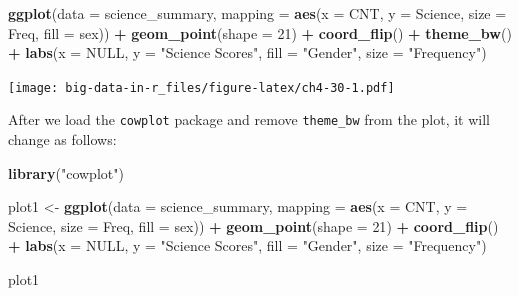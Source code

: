 \documentclass[]{book}
\newenvironment{Shaded}{\begin{snugshade}}{\end{snugshade}}
\newcommand{\DataTypeTok}[1]{\textcolor[rgb]{0.13,0.29,0.53}{#1}}
\newcommand{\DecValTok}[1]{\textcolor[rgb]{0.00,0.00,0.81}{#1}}
\newcommand{\KeywordTok}[1]{\textcolor[rgb]{0.13,0.29,0.53}{\textbf{#1}}}
\newcommand{\NormalTok}[1]{#1}
\newcommand{\OperatorTok}[1]{\textcolor[rgb]{0.81,0.36,0.00}{\textbf{#1}}}
\newcommand{\OtherTok}[1]{\textcolor[rgb]{0.56,0.35,0.01}{#1}}
\newcommand{\StringTok}[1]{\textcolor[rgb]{0.31,0.60,0.02}{#1}}
\begin{document}
\begin{Shaded}
\begin{Highlighting}[]
\KeywordTok{ggplot}\NormalTok{(}\DataTypeTok{data =}\NormalTok{ science_summary,}
       \DataTypeTok{mapping =} \KeywordTok{aes}\NormalTok{(}\DataTypeTok{x =}\NormalTok{ CNT, }\DataTypeTok{y =}\NormalTok{ Science, }\DataTypeTok{size =}\NormalTok{ Freq, }\DataTypeTok{fill =}\NormalTok{ sex)) }\OperatorTok{+}
\StringTok{  }\KeywordTok{geom_point}\NormalTok{(}\DataTypeTok{shape =} \DecValTok{21}\NormalTok{) }\OperatorTok{+}
\StringTok{  }\KeywordTok{coord_flip}\NormalTok{() }\OperatorTok{+}
\StringTok{  }\KeywordTok{theme_bw}\NormalTok{() }\OperatorTok{+}\StringTok{ }
\StringTok{  }\KeywordTok{labs}\NormalTok{(}\DataTypeTok{x =} \OtherTok{NULL}\NormalTok{, }\DataTypeTok{y =} \StringTok{"Science Scores"}\NormalTok{, }\DataTypeTok{fill =} \StringTok{"Gender"}\NormalTok{,}
       \DataTypeTok{size =} \StringTok{"Frequency"}\NormalTok{)}
\end{Highlighting}
\end{Shaded}

\texttt{[image: big-data-in-r\_files/figure-latex/ch4-30-1.pdf]}

After we load the \texttt{cowplot} package and remove \texttt{theme\_bw} from the plot, it will change as follows:

\begin{Shaded}
\begin{Highlighting}[]
\KeywordTok{library}\NormalTok{(}\StringTok{"cowplot"}\NormalTok{)}

\NormalTok{plot1 <-}
\StringTok{  }\KeywordTok{ggplot}\NormalTok{(}\DataTypeTok{data =}\NormalTok{ science_summary,}
         \DataTypeTok{mapping =} \KeywordTok{aes}\NormalTok{(}\DataTypeTok{x =}\NormalTok{ CNT, }\DataTypeTok{y =}\NormalTok{ Science, }\DataTypeTok{size =}\NormalTok{ Freq, }\DataTypeTok{fill =}\NormalTok{ sex)) }\OperatorTok{+}
\StringTok{  }\KeywordTok{geom_point}\NormalTok{(}\DataTypeTok{shape =} \DecValTok{21}\NormalTok{) }\OperatorTok{+}
\StringTok{  }\KeywordTok{coord_flip}\NormalTok{() }\OperatorTok{+}
\StringTok{  }\KeywordTok{labs}\NormalTok{(}\DataTypeTok{x =} \OtherTok{NULL}\NormalTok{, }\DataTypeTok{y =} \StringTok{"Science Scores"}\NormalTok{, }\DataTypeTok{fill =} \StringTok{"Gender"}\NormalTok{,}
       \DataTypeTok{size =} \StringTok{"Frequency"}\NormalTok{)}

\NormalTok{plot1}
\end{Highlighting}
\end{Shaded}
\end{document}
